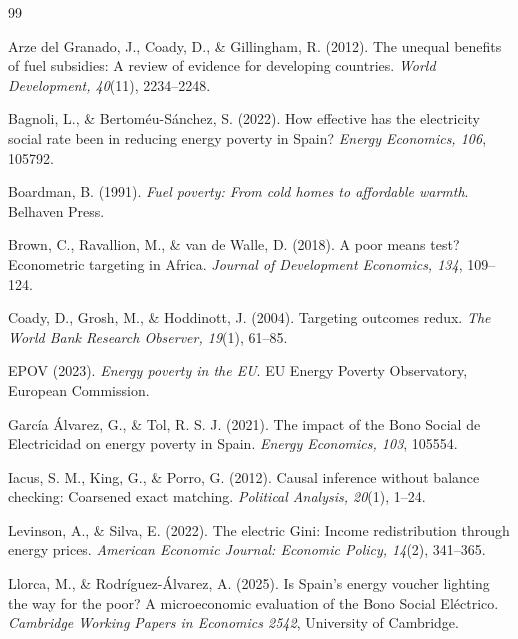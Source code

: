 \documentclass[11pt,a4paper]{article}
\begin{document}
\begin{thebibliography}{99}
\setlength{\itemsep}{2pt}

 Arze del Granado, J., Coady,
D., \& Gillingham, R. (2012). The unequal benefits of fuel subsidies: A review
of evidence for developing countries. \textit{World Development, 40}(11),
2234--2248.

 Bagnoli, L., \&
Bertom\'eu-S\'anchez, S. (2022). How effective has the electricity social rate
been in reducing energy poverty in Spain? \textit{Energy Economics, 106},
105792.

 Boardman, B. (1991). \textit{Fuel
poverty: From cold homes to affordable warmth}. Belhaven Press.

 Brown, C., Ravallion, M., \& van de
Walle, D. (2018). A poor means test? Econometric targeting in Africa.
\textit{Journal of Development Economics, 134}, 109--124.

 Coady, D., Grosh, M., \& Hoddinott, J.
(2004). Targeting outcomes redux. \textit{The World Bank Research Observer,
19}(1), 61--85.

 EPOV (2023). \textit{Energy poverty in the EU}.
EU Energy Poverty Observatory, European Commission.

 Garc\'ia \'Alvarez, G.,
\& Tol, R. S. J. (2021). The impact of the Bono Social de Electricidad on
energy poverty in Spain. \textit{Energy Economics, 103}, 105554.

 Iacus, S. M., King, G., \& Porro, G.
(2012). Causal inference without balance checking: Coarsened exact matching.
\textit{Political Analysis, 20}(1), 1--24.

 Levinson, A., \& Silva, E.
(2022). The electric Gini: Income redistribution through energy prices.
\textit{American Economic Journal: Economic Policy, 14}(2), 341--365.

 Llorca, M., \&
Rodr\'iguez-\'Alvarez, A. (2025). Is Spain's energy voucher lighting the way
for the poor? A microeconomic evaluation of the Bono Social El\'ectrico.
\textit{Cambridge Working Papers in Economics 2542}, University of Cambridge.


\end{thebibliography}
\end{document}
